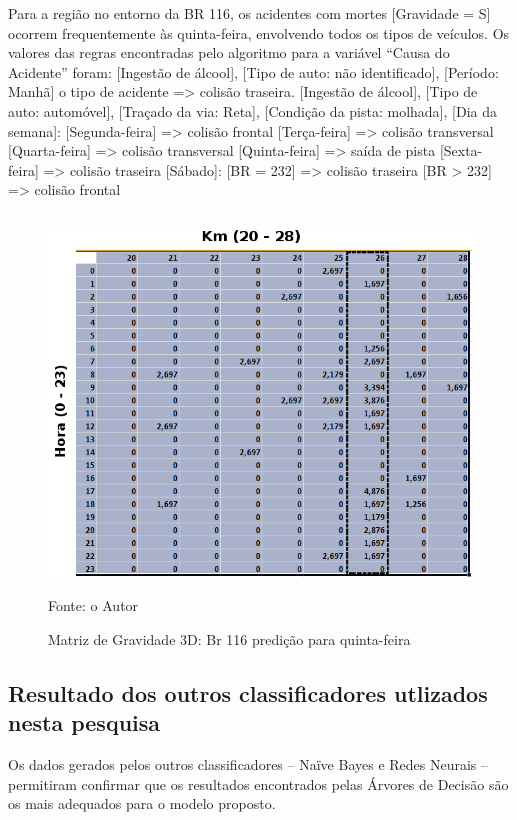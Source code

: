 \pagebreak


Para a região no entorno da BR 116, os acidentes com
mortes [Gravidade = S] ocorrem frequentemente às quinta-feira, envolvendo todos os tipos de veículos.
Os valores das regras encontradas pelo algoritmo para a
variável “Causa do Acidente” foram:
[Ingestão de álcool], [Tipo de auto: não identificado], [Período:
Manhã] o tipo de acidente => colisão traseira.
[Ingestão de álcool], [Tipo de auto: automóvel], [Traçado da
via: Reta], [Condição da pista: molhada], [Dia da semana]:
[Segunda-feira] => colisão frontal
[Terça-feira] => colisão transversal
[Quarta-feira] => colisão transversal
[Quinta-feira] => saída de pista
[Sexta-feira] => colisão traseira
[Sábado]: [BR = 232] => colisão traseira
	[BR > 232] => colisão frontal


\begin{figure}[htbp!]
	\centering
	\caption{Matriz de Gravidade 3D: Br 116 predição para quinta-feira}
	\label{fig:MatrizMortos2d-101}
	\includegraphics[width=120mm, height=100mm]{Figuras/Resultados/MGrav3D116}\\
	\tiny Fonte: o Autor
\end{figure}


\pagebreak

\subsection{Resultado dos outros classificadores utlizados nesta pesquisa}

Os dados gerados pelos outros classificadores -- Naïve Bayes e Redes Neurais -- permitiram confirmar que os resultados encontrados pelas Árvores de Decisão são os mais adequados para o modelo proposto.

